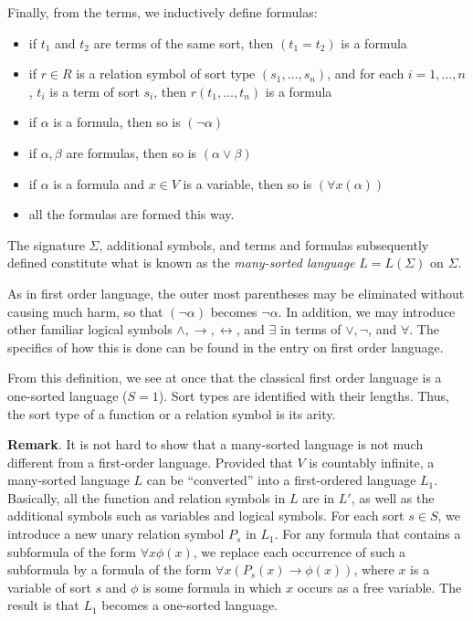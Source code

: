 \documentclass[12pt]{article}
\begin{document}
Finally, from the terms, we inductively define formulas:
\begin{itemize}
\item if $t_1$ and $t_2$ are terms of the same sort, then $(t_1=t_2)$ is a formula
\item if $r\in R$ is a relation symbol of sort type $(s_1,\ldots,s_n)$, and for each $i=1,\ldots,n$, $t_i$ is a term of sort $s_i$, then $r(t_1,\ldots,t_n)$ is a formula
\item if $\alpha$ is a formula, then so is $(\neg \alpha)$
\item if $\alpha,\beta$ are formulas, then so is $(\alpha \vee \beta)$
\item if $\alpha$ is a formula and $x\in V$ is a variable, then so is $(\forall x (\alpha))$
\item all the formulas are formed this way.
\end{itemize}

The signature $\Sigma$, additional symbols, and terms and formulas subsequently defined constitute what is known as the \emph{many-sorted language} $L=L(\Sigma)$ on $\Sigma$.

As in first order language, the outer most parentheses may be eliminated without causing much harm, so that $(\neg \alpha)$ becomes $\neg \alpha$.  In addition, we may introduce other familiar logical symbols $\wedge, \to, \leftrightarrow$, and $\exists$ in terms of $\vee,\neg$, and $\forall$.  The specifics of how this is done can be found in the entry on first order language.

From this definition, we see at once that the classical first order language is a one-sorted language ($S=1$).  Sort types are identified with their lengths.  Thus, the sort type of a function or a relation symbol is its arity.

\textbf{Remark}.  It is not hard to show that a many-sorted language is not much different from a first-order language.  Provided that $V$ is countably infinite, a many-sorted language $L$ can be ``converted'' into a first-ordered language $L_1$.  Basically, all the function and relation symbols in $L$ are in $L'$, as well as the additional symbols such as variables and logical symbols.  For each sort $s\in S$, we introduce a new unary relation symbol $P_s$ in $L_1$.  For any formula that contains a subformula of the form $\forall x \phi(x)$, we replace each occurrence of such a subformula by a formula of the form $\forall x (P_s(x)\to \phi(x))$, where $x$ is a variable of sort $s$ and $\phi$ is some formula in which $x$ occurs as a free variable.  The result is that $L_1$ becomes a one-sorted language.
\end{document}
